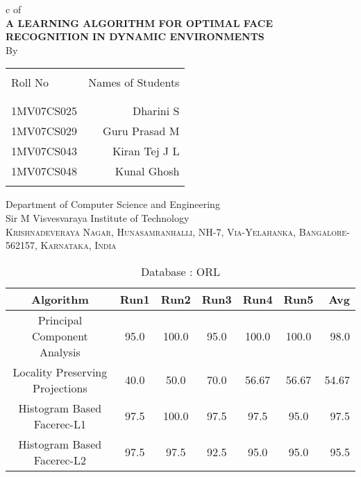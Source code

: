 \documentclass[10pt,a4paper]{article}
\begin{document}
\begin{center}

c
\textup{\Large of }\\[0.5cm]


\uppercase{\Large \textbf {A Learning Algorithm for Optimal Face Recognition in Dynamic Environments}}\\[3.0cm]

\vspace{1.0cm}
\normalsize By \\
\begin{table}[h]
\centering
\begin{tabular}{lr}\hline \\
Roll No & Names of Students \\ \\ \hline
\\
1MV07CS025 & Dharini S \\
1MV07CS029 & Guru Prasad M \\
1MV07CS043 & Kiran Tej J L \\
1MV07CS048 & Kunal Ghosh \\ \\ \hline 
\end{tabular}
\end{table}

\vfill

\normalsize

\Large{Department of Computer Science and Engineering}\\
\LARGE{Sir M Visvesvaraya Institute of Technology }\\
\normalsize
\textsc{Krishnadeveraya Nagar, Hunasamranhalli, NH-7,
Via-Yelahanka, Bangalore-562157, Karnataka, India}\\

\vspace{0.5cm}

\newpage

\begin{table}
\caption{Database : ORL}
\centering
\begin{tabular}{| c | c | c | c | c | c | r | } \hline 
Algorithm & Run1 & Run2 & Run3 & Run4 & Run5 & Avg  \\  
\hline
Principal Component Analysis & 95.0 & 100.0 & 95.0 & 100.0 & 100.0 & 98.0 \\
\hline
Locality Preserving Projections & 40.0 & 50.0 & 70.0 & 56.67 & 56.67 & 54.67 \\
\hline
Histogram Based Facerec-L1 & 97.5 & 100.0 & 97.5 & 97.5 & 95.0 & 97.5 \\
\hline
Histogram Based Facerec-L2 & 97.5 & 97.5 & 92.5 & 95.0 & 95.0 & 95.5 \\
\hline
\end{tabular}
\end{table}



\end{center}
\end{document}
